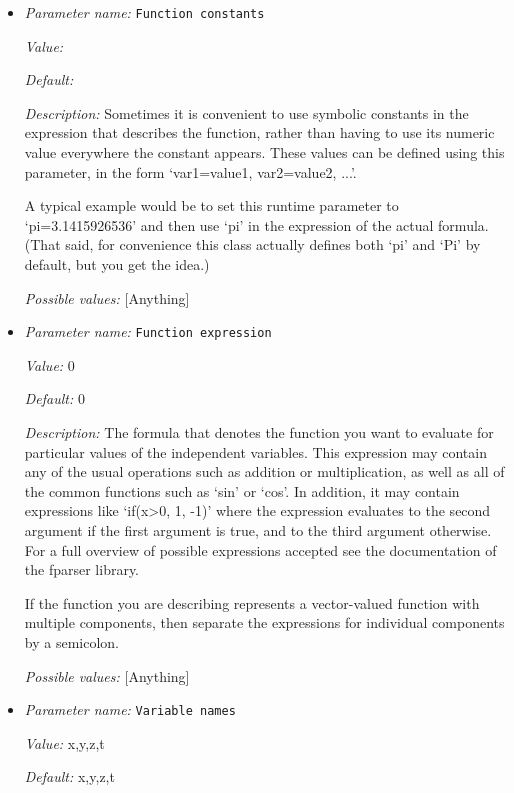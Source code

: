 \begin{itemize}
\item {\it Parameter name:} {\tt Function constants}


{\it Value:} 


{\it Default:} 


{\it Description:} Sometimes it is convenient to use symbolic constants in the expression that describes the function, rather than having to use its numeric value everywhere the constant appears. These values can be defined using this parameter, in the form `var1=value1, var2=value2, ...'.

A typical example would be to set this runtime parameter to `pi=3.1415926536' and then use `pi' in the expression of the actual formula. (That said, for convenience this class actually defines both `pi' and `Pi' by default, but you get the idea.)


{\it Possible values:} [Anything]
\item {\it Parameter name:} {\tt Function expression}


{\it Value:} 0


{\it Default:} 0


{\it Description:} The formula that denotes the function you want to evaluate for particular values of the independent variables. This expression may contain any of the usual operations such as addition or multiplication, as well as all of the common functions such as `sin' or `cos'. In addition, it may contain expressions like `if(x>0, 1, -1)' where the expression evaluates to the second argument if the first argument is true, and to the third argument otherwise. For a full overview of possible expressions accepted see the documentation of the fparser library.

If the function you are describing represents a vector-valued function with multiple components, then separate the expressions for individual components by a semicolon.


{\it Possible values:} [Anything]
\item {\it Parameter name:} {\tt Variable names}


{\it Value:} x,y,z,t


{\it Default:} x,y,z,t



\end{itemize}
